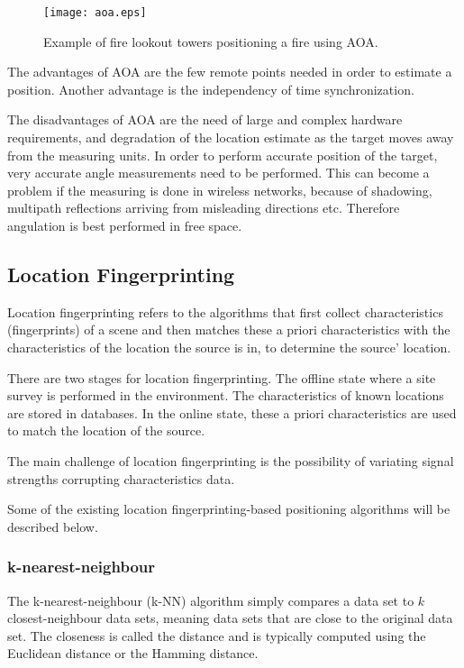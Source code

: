   \begin{figure}
    \centering
    \texttt{[image: aoa.eps]}
    \caption{Example of fire lookout towers positioning a fire using AOA.}
      \label{fig:aoa}
  \end{figure}

  The advantages of AOA are the few remote points needed in order to estimate a position. Another advantage is the independency of time synchronization.

  The disadvantages of AOA are the need of large and complex hardware requirements, and degradation of the location estimate as the target moves away from the measuring units. In order to perform accurate position of the target, very accurate angle measurements need to be performed. This can become a problem if the measuring is done in wireless networks, because of shadowing, multipath reflections arriving from misleading directions etc. Therefore angulation is best performed in free space.

  \subsection{Location Fingerprinting}

  Location fingerprinting refers to the algorithms that first collect characteristics (fingerprints) of a scene and then matches these a priori characteristics with the characteristics of the location the source is in, to determine the source' location.

  There are two stages for location fingerprinting. The offline state where a site survey is performed in the environment. The characteristics of known locations are stored in databases. In the online state, these a priori characteristics are used to match the location of the source.

  The main challenge of location fingerprinting is the possibility of variating signal strengths corrupting characteristics data.

  Some of the existing location fingerprinting-based positioning algorithms will be described below.

  \subsubsection{k-nearest-neighbour}

  The k-nearest-neighbour (k-NN) algorithm simply compares a data set to $k$ closest-neighbour data sets, meaning data sets that are close to the original data set. The closeness is called the distance and is typically computed using the Euclidean distance or the Hamming distance.\cite{Liu2007, wiki_knn}


